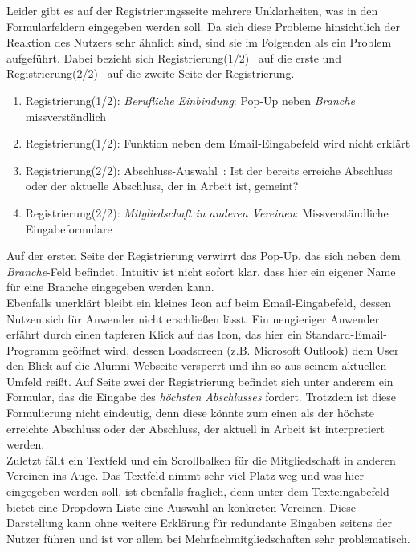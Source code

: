 \label{prob:reg:roterStern}
{ Leider gibt es auf der Registrierungsseite mehrere Unklarheiten, was in den Formularfeldern eingegeben werden soll. Da sich diese Probleme hinsichtlich der Reaktion
des Nutzers sehr ähnlich sind, sind sie im Folgenden als ein Problem aufgeführt. Dabei bezieht sich \glqq Registrierung(1/2)\grqq~ auf die erste und \glqq Registrierung(2/2)\grqq ~ auf die zweite Seite der Registrierung.
\begin{enumerate}
	\item {Registrierung(1/2): \emph{Berufliche Einbindung}: Pop-Up neben \emph{Branche} missverständlich}
	\item {Registrierung(1/2): Funktion neben dem Email-Eingabefeld wird nicht erklärt}
	\item {Registrierung(2/2): \glqq Abschluss-Auswahl\grqq ~: Ist der bereits erreiche Abschluss oder der aktuelle Abschluss, der in Arbeit ist, gemeint? }
	\item {Registrierung(2/2): \emph{Mitgliedschaft in anderen Vereinen}: Missverständliche Eingabeformulare}	
\end{enumerate}	
Auf der ersten Seite der Registrierung verwirrt das Pop-Up, das sich neben dem \emph{Branche}-Feld befindet. Intuitiv ist nicht sofort klar, dass hier ein eigener
Name für eine Branche eingegeben werden kann.\\
Ebenfalls unerklärt bleibt ein kleines Icon auf beim Email-Eingabefeld, dessen Nutzen sich für Anwender nicht erschließen lässt. Ein neugieriger Anwender erfährt durch einen tapferen Klick auf das Icon, das hier ein Standard-Email-Programm geöffnet wird, dessen Loadscreen (z.B. Microsoft Outlook) dem User den Blick auf die Alumni-Webseite versperrt und ihn so aus seinem aktuellen Umfeld reißt.
Auf Seite zwei der Registrierung befindet sich unter anderem ein Formular, das die Eingabe des \emph{höchsten Abschlusses} fordert. Trotzdem ist diese Formulierung nicht eindeutig,
denn diese könnte zum einen als der höchste erreichte Abschluss oder der Abschluss, der aktuell in Arbeit ist interpretiert werden.\\
Zuletzt fällt ein Textfeld und ein Scrollbalken für die Mitgliedschaft in anderen Vereinen ins Auge. Das Textfeld nimmt sehr viel Platz weg und was hier eingegeben werden soll, ist ebenfalls fraglich, denn unter dem Texteingabefeld bietet eine Dropdown-Liste eine Auswahl an konkreten Vereinen. Diese Darstellung kann ohne weitere Erklärung für redundante Eingaben seitens der Nutzer führen und ist vor allem bei Mehrfachmitgliedschaften sehr problematisch.
}
